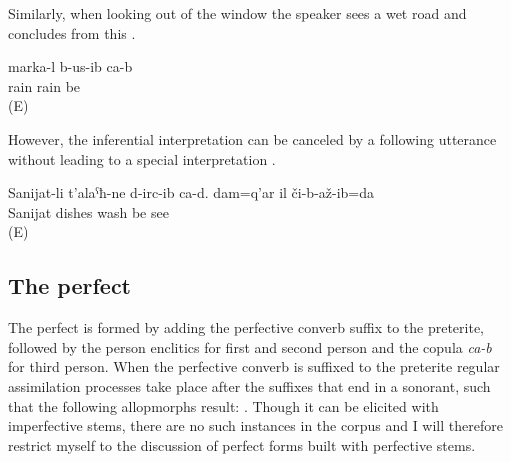 Similarly, when looking out of the window the speaker sees a wet road and concludes from this .
%
\begin{exe}
	\ex	\label{ex:It has rained analytic}
	\gll	marka-l	b-us-ib	ca-b\\
		rain	rain	be\\
	\glt	{} (E)
\end{exe}

However, the inferential interpretation can be canceled by a following utterance without leading to a special interpretation .
%
\begin{exe}
	\ex	\label{ex:Sanijat has washed the dishes. I saw it myself}
	\gll	Sanijat-li 	t'alaˁħ-ne	d-irc-ib ca-d.	dam=q'ar	il	či-b-až-ib=da\\
		Sanijat	dishes	wash be			see\\
	\glt	{} (E)
\end{exe}





\subsection{The perfect}
\label{ssec:The perfect}

The perfect is formed by adding the perfective converb suffix to the preterite, followed by the person enclitics for first and second person and the copula \textit{ca-b} for third person. When the perfective converb is suffixed to the preterite regular assimilation processes take place after the suffixes that end in a sonorant, such that the following allopmorphs result: . Though it can be elicited with imperfective stems, there are no such instances in the corpus and I will therefore restrict myself to the discussion of perfect forms built with perfective stems.

